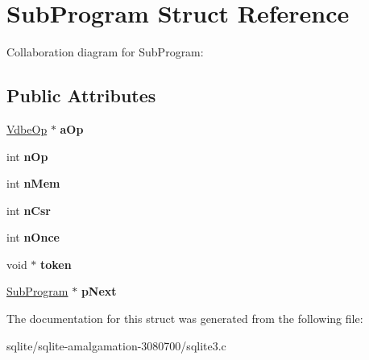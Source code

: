 \hypertarget{struct_sub_program}{\section{Sub\+Program Struct Reference}
\label{struct_sub_program}
}


Collaboration diagram for Sub\+Program\+:
\subsection*{Public Attributes}
\begin{DoxyCompactItemize}
\item 
\hypertarget{struct_sub_program_aa9bb1992fed633d182076a35d6448c7d}{\hyperlink{struct_vdbe_op}{Vdbe\+Op} $\ast$ {\bfseries a\+Op}}\label{struct_sub_program_aa9bb1992fed633d182076a35d6448c7d}

\item 
\hypertarget{struct_sub_program_a6fe204a75ab8254c453be77f024b6d69}{int {\bfseries n\+Op}}\label{struct_sub_program_a6fe204a75ab8254c453be77f024b6d69}

\item 
\hypertarget{struct_sub_program_a9bece42fdeb81085809d7c2f8aa05616}{int {\bfseries n\+Mem}}\label{struct_sub_program_a9bece42fdeb81085809d7c2f8aa05616}

\item 
\hypertarget{struct_sub_program_a83b18aa5cc63aecdbf996c16af1e48bb}{int {\bfseries n\+Csr}}\label{struct_sub_program_a83b18aa5cc63aecdbf996c16af1e48bb}

\item 
\hypertarget{struct_sub_program_a907d5933dd0149be1ef90fcbe91e3c58}{int {\bfseries n\+Once}}\label{struct_sub_program_a907d5933dd0149be1ef90fcbe91e3c58}

\item 
\hypertarget{struct_sub_program_aaea3b67899b092476b107d22a4e2022d}{void $\ast$ {\bfseries token}}\label{struct_sub_program_aaea3b67899b092476b107d22a4e2022d}

\item 
\hypertarget{struct_sub_program_a7da35488ac58a64fa30b88da56aac8b3}{\hyperlink{struct_sub_program}{Sub\+Program} $\ast$ {\bfseries p\+Next}}\label{struct_sub_program_a7da35488ac58a64fa30b88da56aac8b3}

\end{DoxyCompactItemize}


The documentation for this struct was generated from the following file\+:\begin{DoxyCompactItemize}
\item 
sqlite/sqlite-\/amalgamation-\/3080700/sqlite3.\+c\end{DoxyCompactItemize}
